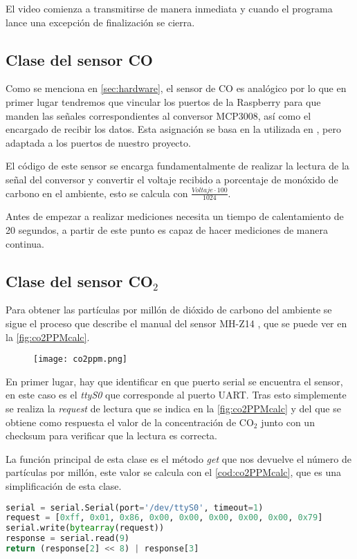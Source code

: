 El video comienza a transmitirse de manera inmediata y cuando el programa lance una excepción de finalización se cierra.

\subsection{Clase del sensor CO}
Como se menciona en \autoref{sec:hardware}, el sensor de CO es analógico por lo que en primer lugar tendremos que vincular los puertos de la Raspberry para que manden las señales correspondientes al conversor MCP3008, así como el encargado de recibir los datos. Esta asignación se basa en la utilizada en \cite{osoyoo_osoyoodriver_2021}, pero adaptada a los puertos de nuestro proyecto.

El código de este sensor se encarga fundamentalmente de realizar la lectura de la señal del conversor y convertir el voltaje recibido a porcentaje de monóxido de carbono en el ambiente, esto se calcula con $\frac{\textit{Voltaje}\cdot 100}{1024}$. 

Antes de empezar a realizar mediciones necesita un tiempo de calentamiento de 20 segundos, a partir de este punto es capaz de hacer mediciones de manera continua.

\subsection{Clase del sensor CO$_2$}
Para obtener las partículas por millón de dióxido de carbono del ambiente se sigue el proceso que describe el manual del sensor MH-Z14 \cite{noauthor_documentacion_nodate}, que se puede ver en la \autoref{fig:co2PPMcalc}.
\begin{figure}[H]
    {\texttt{[image: co2ppm.png]}}
\end{figure}
En primer lugar, hay que identificar en que puerto serial se encuentra el sensor, en este caso es el \textit{ttyS0} que corresponde al puerto UART. Tras esto simplemente se realiza la \textit{request} de lectura que se indica en la \autoref{fig:co2PPMcalc} y del que se obtiene como respuesta el valor de la concentración de CO$_2$ junto con un checksum para verificar que la lectura es correcta.

La función principal de esta clase es el método \textit{get} que nos devuelve el número de partículas por millón, este valor se calcula con el \autoref{cod:co2PPMcalc}, que es una simplificación de esta clase.
\begin{lstlisting}[language=Python, label=cod:co2PPMcalc, caption=Calculo de la concentración de CO$_2$]
serial = serial.Serial(port='/dev/ttyS0', timeout=1)
request = [0xff, 0x01, 0x86, 0x00, 0x00, 0x00, 0x00, 0x00, 0x79]
serial.write(bytearray(request))
response = serial.read(9)
return (response[2] << 8) | response[3]
\end{lstlisting} 

